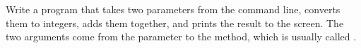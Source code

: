 Write a program that takes two parameters from the command line, converts them to integers, adds them together, and prints the result to the screen. The two arguments come from the parameter to the  method, which is usually called .
